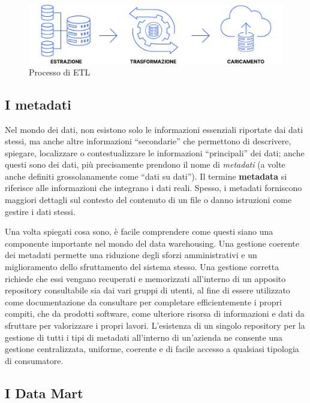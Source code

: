 \begin{figure}[H]
    \centering
    \includegraphics[width=1\linewidth]{figure/capitolo_2/ETL Process.pdf}
    \caption{Processo di ETL}
    \label{fig:ETL Process}
\end{figure}

\subsection{I metadati}

Nel mondo dei dati, non esistono solo le informazioni essenziali riportate dai dati stessi, ma anche altre informazioni “secondarie” che permettono di descrivere, spiegare, localizzare o contestualizzare le informazioni “principali” dei dati; anche questi sono dei dati, più precisamente prendono il nome di \textit{metadati} (a volte anche definiti grossolanamente come “dati su dati”). Il termine \textbf{metadata} si riferisce alle informazioni che integrano i dati reali. Spesso, i metadati forniscono maggiori dettagli sul contesto del contenuto di un file o danno istruzioni come gestire i dati stessi.\cite{ionos_metadata}

Una volta spiegati cosa sono, è facile comprendere come questi siano una componente importante nel mondo del data warehousing. Una gestione coerente dei metadati permette una riduzione degli sforzi amministrativi e un miglioramento dello sfruttamento del sistema stesso. Una gestione corretta richiede che essi vengano recuperati e memorizzati all'interno di un apposito repository consultabile sia dai vari gruppi di utenti, al fine di essere utilizzato come documentazione da consultare per completare efficientemente i propri compiti, che da prodotti software, come ulteriore risorsa di informazioni e dati da sfruttare per valorizzare i propri lavori. L'esistenza di un singolo repository per la gestione di tutti i tipi di metadati all'interno di un'azienda ne consente una gestione centralizzata, uniforme, coerente e di facile accesso a qualsiasi tipologia di consumatore.\cite{metadata_standards}

\subsection{I Data Mart}

